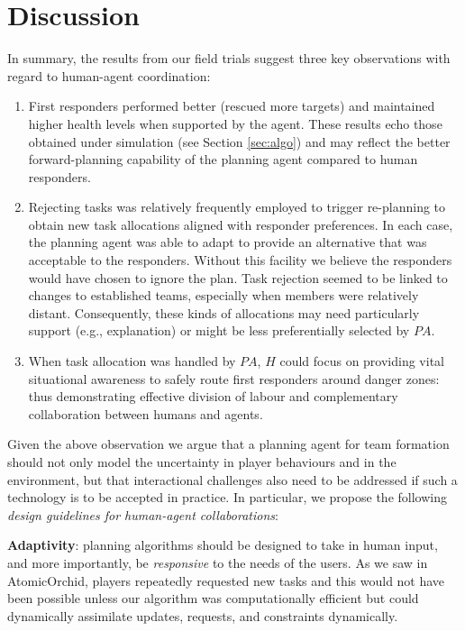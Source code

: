 \section{Discussion}
\label{sec:discussion}
In summary, the results from our field trials suggest three key observations with regard to  human-agent coordination: 
\begin{enumerate}
\item First responders performed better (rescued more targets)  and maintained higher health levels when supported by the agent.  These results echo those obtained under simulation (see Section \ref{sec:algo}) and  may reflect the better forward-planning capability of the planning agent compared to human responders. 
 
\item Rejecting tasks was relatively frequently employed to trigger re-planning to obtain new task allocations aligned with responder preferences.  In each case, the planning agent was able to adapt to provide an alternative  that was acceptable to the responders. Without this facility we believe the responders would have chosen to ignore the plan. Task rejection seemed to be linked to changes to established teams, especially when members were relatively distant. Consequently, these kinds of allocations may need particularly support (e.g., explanation) or might be less preferentially selected by $PA$.

\item When task allocation was handled by $PA$, $H$ could focus on providing vital situational awareness to safely route first responders around danger zones: thus demonstrating effective division of labour and complementary collaboration between humans and agents.
\end{enumerate}

Given the above observation we argue that a planning agent for team formation should not only model the uncertainty in player behaviours and in the environment, but that interactional challenges also need to be addressed  if such a technology is to be accepted in practice. In particular, we propose the following \textit{design guidelines for human-agent collaborations}:

\noindent \textbf{Adaptivity}:  planning algorithms should be designed to take in human input, and more importantly, be \emph{responsive} to the needs of the users. As we saw in AtomicOrchid, players repeatedly requested new tasks and this would not have been possible unless our algorithm  was computationally efficient but could dynamically assimilate updates, requests, and constraints dynamically. 

